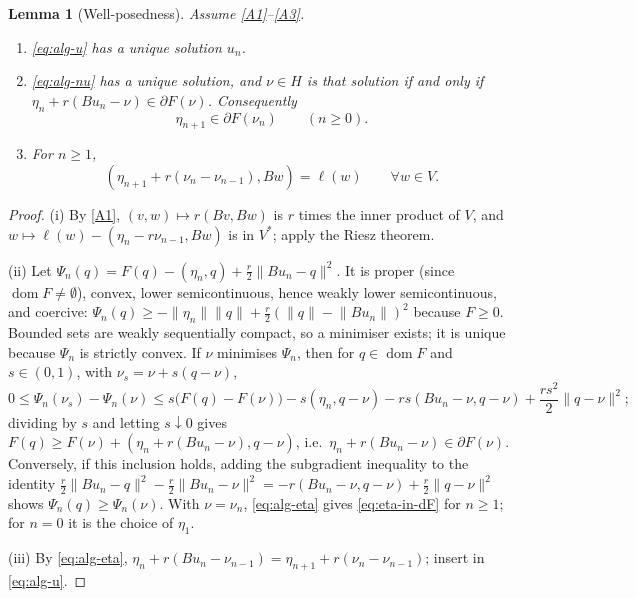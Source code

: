 \documentclass[11pt]{amsart}
\newtheorem{lemma}[theorem]{Lemma}
\theoremstyle{definition}
\theoremstyle{remark}
\numberwithin{equation}{section}
\newcommand{\norm}[1]{\lVert #1\rVert}
\DeclareMathOperator{\dom}{dom}
\begin{document}
\begin{lemma}[Well-posedness]\label{lem:wellposed}
Assume \ref{A1}--\ref{A3}.
\begin{enumerate}[label=\textup{(\roman*)}]
\item \eqref{eq:alg-u} has a unique solution $u_n$.
\item \eqref{eq:alg-nu} has a unique solution, and $\nu\in H$ is that solution if and only if $\eta_n+r(Bu_n-\nu)\in\partial F(\nu)$. Consequently
\begin{equation}\label{eq:eta-in-dF}
\eta_{n+1}\in\partial F(\nu_n)\qquad(n\ge0).
\end{equation}
\item For $n\ge1$,
\begin{equation}\label{eq:alg-u2}
(\eta_{n+1}+r(\nu_n-\nu_{n-1}),Bw)=\ell(w)\qquad\forall w\in V .
\end{equation}
\end{enumerate}
\end{lemma}
\begin{proof}
(i) By \ref{A1}, $(v,w)\mapsto r(Bv,Bw)$ is $r$ times the inner product of $V$, and $w\mapsto\ell(w)-(\eta_n-r\nu_{n-1},Bw)$ is in $V^*$; apply the Riesz theorem.

(ii) Let $\Psi_n(q)=F(q)-(\eta_n,q)+\frac r2\norm{Bu_n-q}^2$. It is proper (since $\dom F\ne\emptyset$), convex, lower semicontinuous, hence weakly lower semicontinuous, and coercive: $\Psi_n(q)\ge-\norm{\eta_n}\norm q+\frac r2(\norm q-\norm{Bu_n})^2$ because $F\ge0$. Bounded sets are weakly sequentially compact, so a minimiser exists; it is unique because $\Psi_n$ is strictly convex. If $\nu$ minimises $\Psi_n$, then for $q\in\dom F$ and $s\in(0,1)$, with $\nu_s=\nu+s(q-\nu)$,
\[
0\le\Psi_n(\nu_s)-\Psi_n(\nu)\le s\big(F(q)-F(\nu)\big)-s(\eta_n,q-\nu)-rs(Bu_n-\nu,q-\nu)+\frac{rs^2}2\norm{q-\nu}^2 ;
\]
dividing by $s$ and letting $s\downarrow0$ gives $F(q)\ge F(\nu)+(\eta_n+r(Bu_n-\nu),q-\nu)$, i.e.\ $\eta_n+r(Bu_n-\nu)\in\partial F(\nu)$. Conversely, if this inclusion holds, adding the subgradient inequality to the identity $\frac r2\norm{Bu_n-q}^2-\frac r2\norm{Bu_n-\nu}^2=-r(Bu_n-\nu,q-\nu)+\frac r2\norm{q-\nu}^2$ shows $\Psi_n(q)\ge\Psi_n(\nu)$. With $\nu=\nu_n$, \eqref{eq:alg-eta} gives \eqref{eq:eta-in-dF} for $n\ge1$; for $n=0$ it is the choice of $\eta_1$.

(iii) By \eqref{eq:alg-eta}, $\eta_n+r(Bu_n-\nu_{n-1})=\eta_{n+1}+r(\nu_n-\nu_{n-1})$; insert in \eqref{eq:alg-u}.
\end{proof}
\end{document}
